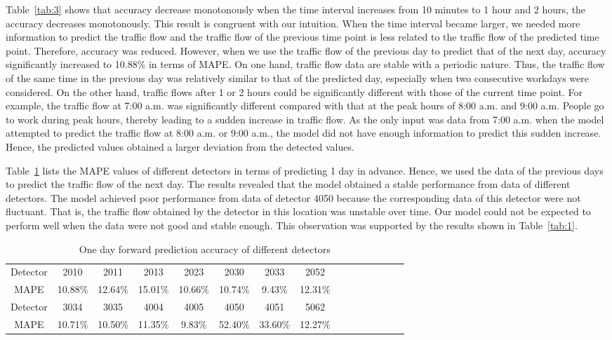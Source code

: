 \documentclass[twocolumn]{article}
\begin{document}
\par
Table~\ref{tab:3} shows that accuracy decrease monotonously when the time interval increases from 10 minutes to 1 hour and 2 hours, the accuracy decreases monotonously. This result is congruent with our intuition. When the time interval became larger, we needed more information to predict the traffic flow and the traffic flow of the previous time point is less related to the traffic flow of the predicted time point. Therefore, accuracy was reduced. However, when we use the traffic flow of the previous day to predict that of the next day, accuracy significantly increased to 10.88\% in terms of MAPE. On one hand, traffic flow data are stable with a periodic nature\citep{tan2013tensor,tan2016comparison,wu2017robust}. Thus, the traffic flow of the same time in the previous day was relatively similar to that of the predicted day, especially when two consecutive workdays were considered. On the other hand, traffic flows after 1 or 2 hours could be significantly different with those of the current time point. For example, the traffic flow at 7:00 a.m. was significantly different compared with that at the peak hours of 8:00 a.m. and 9:00 a.m. People go to work during peak hours, thereby leading to a sudden increase in traffic flow. As the only input was data from 7:00 a.m. when the model attempted to predict the traffic flow at 8:00 a.m. or 9:00 a.m., the model did not have enough information to predict this sudden increase. Hence, the predicted values obtained a larger deviation from the detected values.



\par
Table~\ref{tab:4} lists the MAPE values of different detectors in terms of predicting 1 day in advance. Hence, we used the data of the previous days to predict the traffic flow of the next day. The results revealed that the model obtained a stable performance from data of different detectors. The model achieved poor performance from data of detector 4050 because the corresponding data of this detector were not fluctuant. That is, the traffic flow obtained by the detector in this location was unstable over time. Our model could not be expected to perform well when the data were not good and stable enough. This observation was supported by the results shown in Table~\ref{tab:1}.

\begin{table}
 \centering
    \caption{One day forward prediction accuracy of different detectors}
    \label{tab:4}
    \begin{tabular}{ccccccccccccccc}
    \toprule
    Detector & 2010 & 2011 & 2013 & 2023 & 2030 & 2033 & 2052 \\
MAPE & 10.88\%
&12.64\% &
15.01\% &
10.66\% &
10.74\% &
9.43\% &
12.31\%\\

\midrule
Detector & 3034 & 3035 & 4004 & 4005 & 4050 & 4051 & 5062 \\
MAPE & 10.71\% &
10.50\% &
11.35\% &
9.83\% &
52.40\% &
33.60\% &
12.27\% \\
    \bottomrule
    \end{tabular}
\end{table}
\end{document}
